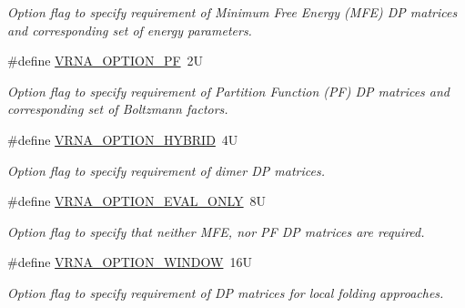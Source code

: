 \begin{DoxyCompactItemize}
\begin{DoxyCompactList}\small\item\em Option flag to specify requirement of Minimum Free Energy (M\+FE) DP matrices and corresponding set of energy parameters. \end{DoxyCompactList}\item 
\#define \mbox{\hyperlink{group__fold__compound_gabfbadcddda3e74ce7f49035ef8f058f7}{V\+R\+N\+A\+\_\+\+O\+P\+T\+I\+O\+N\+\_\+\+PF}}~2U
\begin{DoxyCompactList}\small\item\em Option flag to specify requirement of Partition Function (PF) DP matrices and corresponding set of Boltzmann factors. \end{DoxyCompactList}\item 
\#define \mbox{\hyperlink{group__fold__compound_ga8f681fa12b8d4b348bf58415fd1fc82f}{V\+R\+N\+A\+\_\+\+O\+P\+T\+I\+O\+N\+\_\+\+H\+Y\+B\+R\+ID}}~4U
\begin{DoxyCompactList}\small\item\em Option flag to specify requirement of dimer DP matrices. \end{DoxyCompactList}\item 
\#define \mbox{\hyperlink{group__fold__compound_ga61469c423131552c8483229f8b6c7e0e}{V\+R\+N\+A\+\_\+\+O\+P\+T\+I\+O\+N\+\_\+\+E\+V\+A\+L\+\_\+\+O\+N\+LY}}~8U
\begin{DoxyCompactList}\small\item\em Option flag to specify that neither M\+FE, nor PF DP matrices are required. \end{DoxyCompactList}\item 
\#define \mbox{\hyperlink{group__fold__compound_ga2b2a8009ccdccc3eb1571556261aee8e}{V\+R\+N\+A\+\_\+\+O\+P\+T\+I\+O\+N\+\_\+\+W\+I\+N\+D\+OW}}~16U
\begin{DoxyCompactList}\small\item\em Option flag to specify requirement of DP matrices for local folding approaches. \end{DoxyCompactList}\end{DoxyCompactItemize}
